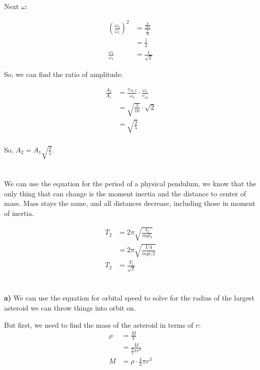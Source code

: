 \documentclass{article}
\begin{document}
Next $\omega$:

\begin{align*}
    \left(\frac{\omega_2}{\omega_1}\right)^2 &= \frac{\frac{k}{2m}}{\frac{k}{m}} \\
    &= \frac{1}{2} \\
    \frac{\omega_2}{\omega_1} &= \frac{1}{\sqrt{2}}
\end{align*}

So, we can find the ratio of amplitude:

\begin{align*}
    \frac{A_2}{A_1} &= \frac{v_{eq,2}}{\omega_2}\cdot\frac{\omega_1}{v_{eq}} \\
    &= \sqrt{\frac{3}{10}}\cdot\sqrt{2} \\
    &= \sqrt{\frac{3}{5}} \\
\end{align*}

So, $A_2 = A_1\sqrt{\frac{3}{5}}$.

\newpage
\section{}

We can use the equation for the period of a physical pendulum, we know that the only thing that can change is the moment inertia and the distance to center of mass. Mass stays the same, and all distances decrease, including those in moment of inertia.

\begin{align*}
    T_2 &= 2\pi\sqrt{\frac{I_2}{mgl_2}} \\
    &= 2\pi\sqrt{\frac{I/4}{mgl/2}} \\
    T_2 &= \frac{T_1}{\sqrt{2}}
\end{align*}

\newpage
\section{}

\textbf{a)} We can use the equation for orbital speed to solve for the radius of the largest asteroid we can throw things into orbit on.

But first, we need to find the mass of the asteroid in terms of $r$:
\begin{align*}
    \rho &= \frac{M}{V} \\
    &= \frac{M}{\frac{4}{3}\pi r^3} \\
    M &= \rho\cdot\frac{4}{3}\pi r^3 \\
\end{align*}
\end{document}
